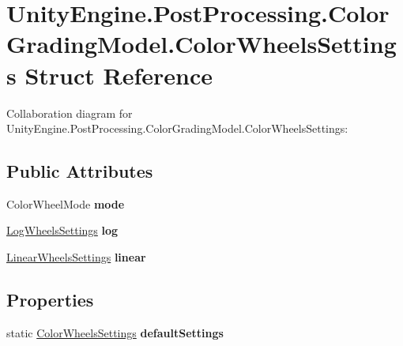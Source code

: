 \hypertarget{struct_unity_engine_1_1_post_processing_1_1_color_grading_model_1_1_color_wheels_settings}{}\section{Unity\+Engine.\+Post\+Processing.\+Color\+Grading\+Model.\+Color\+Wheels\+Settings Struct Reference}
\label{struct_unity_engine_1_1_post_processing_1_1_color_grading_model_1_1_color_wheels_settings}


Collaboration diagram for Unity\+Engine.\+Post\+Processing.\+Color\+Grading\+Model.\+Color\+Wheels\+Settings\+:
\subsection*{Public Attributes}
\begin{DoxyCompactItemize}
\item 
\mbox{\label{struct_unity_engine_1_1_post_processing_1_1_color_grading_model_1_1_color_wheels_settings_a1585463b103bd02972e8d8f1a22e3bf1}} 
Color\+Wheel\+Mode {\bfseries mode}
\item 
\mbox{\label{struct_unity_engine_1_1_post_processing_1_1_color_grading_model_1_1_color_wheels_settings_a4e850e98ea6605f15205c1c570c70ef8}} 
\hyperlink{struct_unity_engine_1_1_post_processing_1_1_color_grading_model_1_1_log_wheels_settings}{Log\+Wheels\+Settings} {\bfseries log}
\item 
\mbox{\label{struct_unity_engine_1_1_post_processing_1_1_color_grading_model_1_1_color_wheels_settings_a854d17dcc8e666c1b2d83c929f51d60e}} 
\hyperlink{struct_unity_engine_1_1_post_processing_1_1_color_grading_model_1_1_linear_wheels_settings}{Linear\+Wheels\+Settings} {\bfseries linear}
\end{DoxyCompactItemize}
\subsection*{Properties}
\begin{DoxyCompactItemize}
\item 
\mbox{\label{struct_unity_engine_1_1_post_processing_1_1_color_grading_model_1_1_color_wheels_settings_a33abb6c6ab3bff855b18c53f85bf392b}} 
static \hyperlink{struct_unity_engine_1_1_post_processing_1_1_color_grading_model_1_1_color_wheels_settings}{Color\+Wheels\+Settings} {\bfseries default\+Settings}
\end{DoxyCompactItemize}


